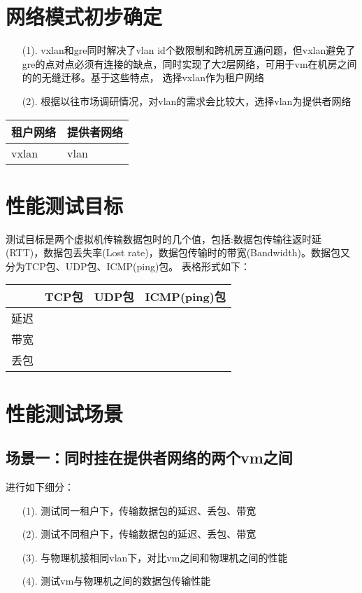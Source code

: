 \documentclass[a4paper,left=1.5cm,right=1.5cm,11pt]{article}
\begin{document}
\section{网络模式初步确定}
\begin{itemize}
	\item[(1).]vxlan和gre同时解决了vlan id个数限制和跨机房互通问题，但vxlan避免了gre的点对点必须有连接的缺点，同时实现了大2层网络，可用于vm在机房之间的的无缝迁移。基于这些特点，
	选择vxlan作为租户网络
	\item[(2).]根据以往市场调研情况，对vlan的需求会比较大，选择vlan为提供者网络
\end{itemize}
\begin{center}
\begin{tabular}[c]{|l|l|}
\hline
租户网络 & 提供者网络\\
\hline
vxlan & vlan\\
\hline
\end{tabular}
\end{center}

\section{性能测试目标}
测试目标是两个虚拟机传输数据包时的几个值，包括:数据包传输往返时延(RTT)，数据包丢失率(Lost rate)，数据包传输时的带宽(Bandwidth)。数据包又分为TCP包、UDP包、ICMP(ping)包。
表格形式如下：
\begin{center}
\begin{tabular}[c]{l|l|l|l}
 & TCP包 & UDP包 & ICMP(ping)包\\
\hline
延迟 & & &\\
\hline
带宽 & & & \\
\hline
丢包 & & & \\
\hline
\end{tabular}
\end{center}
\section{性能测试场景}
\subsection{场景一：同时挂在提供者网络的两个vm之间}
进行如下细分：
\begin{itemize}
	\item[(1).]测试同一租户下，传输数据包的延迟、丢包、带宽
	\item[(2).]测试不同租户下，传输数据包的延迟、丢包、带宽
	\item[(3).]与物理机接相同vlan下，对比vm之间和物理机之间的性能
	\item[(4).]测试vm与物理机之间的数据包传输性能
\end{itemize}
\end{document}
